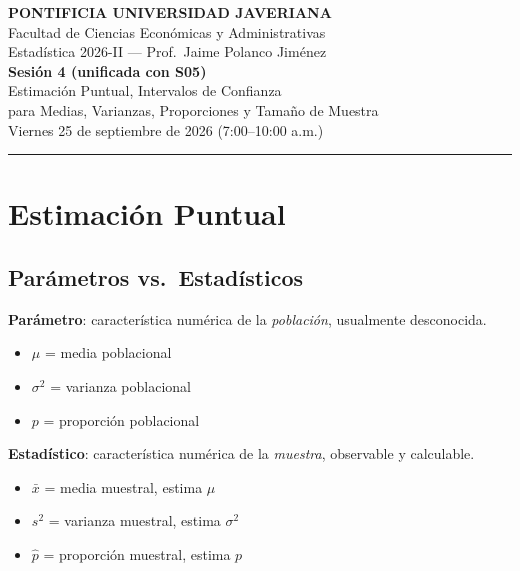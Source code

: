 \documentclass[11pt, a4paper]{article}
\begin{document}
\begin{center}
{\large\bfseries PONTIFICIA UNIVERSIDAD JAVERIANA}\\[3pt]
Facultad de Ciencias Econ\'omicas y Administrativas\\[2pt]
Estad\'istica 2026-II --- Prof.\ Jaime Polanco Jim\'enez\\[6pt]
{\LARGE\bfseries Sesi\'on 4 (unificada con S05)}\\[3pt]
{\large Estimaci\'on Puntual, Intervalos de Confianza\\
para Medias, Varianzas, Proporciones y Tama\~no de Muestra}\\[6pt]
Viernes 25 de septiembre de 2026 \quad (7:00--10:00 a.m.)
\end{center}

\vspace{6pt}
\rule{\linewidth}{0.5pt}

\tableofcontents

\newpage

\section{Estimaci\'on Puntual}

\subsection{Par\'ametros vs.\ Estad\'isticos}

\textbf{Par\'ametro}: caracter\'istica num\'erica de la \emph{poblaci\'on}, usualmente desconocida.
\begin{itemize}
  \item $\mu$ = media poblacional
  \item $\sigma^2$ = varianza poblacional
  \item $p$ = proporci\'on poblacional
\end{itemize}

\textbf{Estad\'istico}: caracter\'istica num\'erica de la \emph{muestra}, observable y calculable.
\begin{itemize}
  \item $\bar{x}$ = media muestral, estima $\mu$
  \item $s^2$ = varianza muestral, estima $\sigma^2$
  \item $\hat{p}$ = proporci\'on muestral, estima $p$
\end{itemize}
\end{document}
